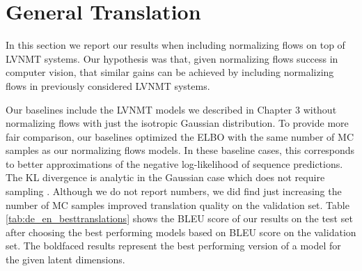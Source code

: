 

\section{General Translation}

In this section we report our results when including normalizing flows on top of \ac{LVNMT} systems. Our hypothesis was that, given normalizing flows success in computer vision, that similar gains can be achieved by including normalizing flows in previously considered \ac{LVNMT} systems.  

Our baselines include the \ac{LVNMT} models we described in Chapter 3 without normalizing flows with just the isotropic Gaussian distribution. To provide more fair comparison, our baselines optimized the \ac{ELBO} with the same number of \ac{MC} samples as our normalizing flows models. In these baseline cases, this corresponds to better approximations of the negative log-likelihood of sequence predictions. The KL divergence is analytic in the Gaussian case which does not require sampling \cite{kingma2014autoencodingVB,rezende2014stochasticBackprop}. Although we do not report numbers, we did find just increasing the number of \ac{MC} samples improved translation quality on the validation set.  Table \ref{tab:de_en_besttranslations} shows the BLEU score of our results on the test set after choosing the best performing models based on BLEU score on the validation set. The boldfaced results represent the best performing version of a model for the given latent dimensions.


